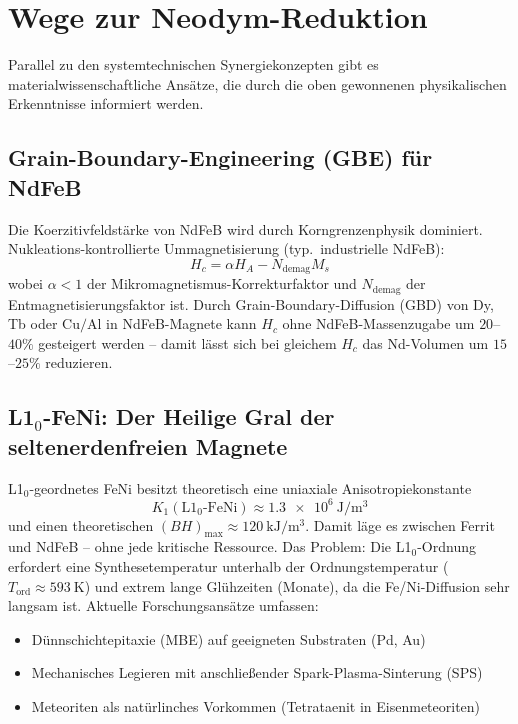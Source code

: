 ﻿\documentclass[12pt, a4paper]{report}
\theoremstyle{definition}
\theoremstyle{remark}
\begin{document}
\section{Wege zur Neodym-Reduktion}
\label{ssec:material_wege}

Parallel zu den systemtechnischen Synergiekonzepten gibt es materialwissenschaftliche
Ansätze, die durch die oben gewonnenen physikalischen Erkenntnisse informiert werden.

\subsection{Grain-Boundary-Engineering (GBE) für NdFeB}

Die Koerzitivfeldstärke von NdFeB wird durch Korngrenzenphysik dominiert.
Nukleations-kontrollierte Ummagnetisierung (typ.\ industrielle NdFeB):
\begin{equation}
  H_c = \alpha H_A - N_{\text{demag}} M_s
  \label{eq:Hc_nukleation}
\end{equation}
wobei $\alpha < 1$ der Mikromagnetismus-Korrekturfaktor und $N_{\text{demag}}$
der Entmagnetisierungsfaktor ist. Durch Grain-Boundary-Diffusion (GBD) von Dy,
Tb oder $\text{Cu/Al}$ in NdFeB-Magnete kann $H_c$ ohne NdFeB-Massenzugabe um
$20$--$40\%$ gesteigert werden -- damit lässt sich bei gleichem $H_c$ das
Nd-Volumen um $15$--$25\%$ reduzieren.

\subsection{\texorpdfstring{L1$_0$-FeNi: Der Heilige Gral der seltenerdenfreien Magnete}{L10-FeNi: Der Heilige Gral der seltenerdenfreien Magnete}}

L1$_0$-geordnetes FeNi besitzt theoretisch eine uniaxiale Anisotropiekonstante
\begin{equation}
  K_1(\text{L1}_0\text{-FeNi}) \approx \SI{1.3e6}{\joule\per\cubic\metre}
  \label{eq:K1_FeNi}
\end{equation}
und einen theoretischen $(BH)_{\max} \approx \SI{120}{\kilo\joule\per\cubic\metre}$.
Damit läge es zwischen Ferrit und NdFeB -- ohne jede kritische Ressource.
Das Problem: Die L1$_0$-Ordnung erfordert eine Synthesetemperatur unterhalb der
Ordnungstemperatur ($T_{\text{ord}} \approx \SI{593}{\kelvin}$) und extrem lange
Glühzeiten (Monate), da die Fe/Ni-Diffusion sehr langsam ist. Aktuelle
Forschungsansätze umfassen:
\begin{itemize}
  \item Dünnschichtepitaxie (MBE) auf geeigneten Substraten (Pd, Au)
  \item Mechanisches Legieren mit anschließender Spark-Plasma-Sinterung (SPS)
  \item Meteoriten als natürlinches Vorkommen (Tetrataenit in Eisenmeteoriten)
\end{itemize}
\end{document}
